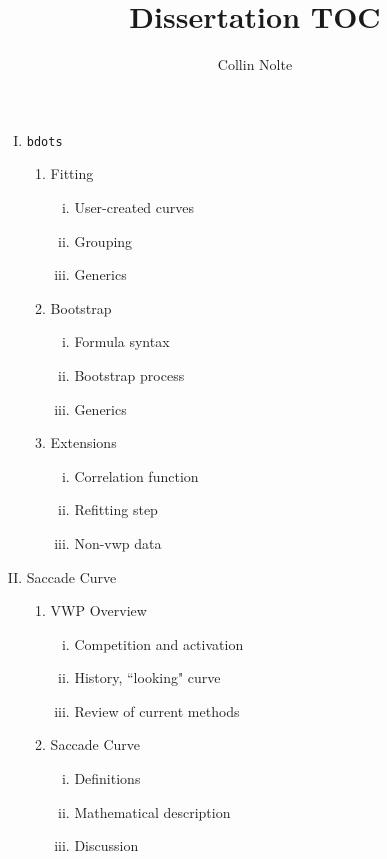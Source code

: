 \documentclass[12pt, letterpaper, twoside]{article}
\begin{document}
\title{\vspace{-3cm}Dissertation TOC}
\author{Collin Nolte}
\date{}
\maketitle

\begin{enumerate}[I.]
\item \texttt{bdots}
  \begin{enumerate}[1.]
  \item Fitting
    \begin{enumerate}[i.]
    \item User-created curves
    \item Grouping
    \item Generics
    \end{enumerate}
  \item Bootstrap
    \begin{enumerate}[i.]
    \item Formula syntax
    \item Bootstrap process
    \item Generics
    \end{enumerate}
  \item Extensions
    \begin{enumerate}[i.]
    \item Correlation function
    \item Refitting step
    \item Non-vwp data
    \end{enumerate}
  \end{enumerate}
\item Saccade Curve
  \begin{enumerate}[1.]
  \item VWP Overview
    \begin{enumerate}[i.]
    \item Competition and activation
    \item History, ``looking" curve
    \item Review of current methods
    \end{enumerate}
  \item Saccade Curve
    \begin{enumerate}[i.]
    \item Definitions
    \item Mathematical description
    \item Discussion
    \end{enumerate}

\end{enumerate}
\end{enumerate}
\end{document}
